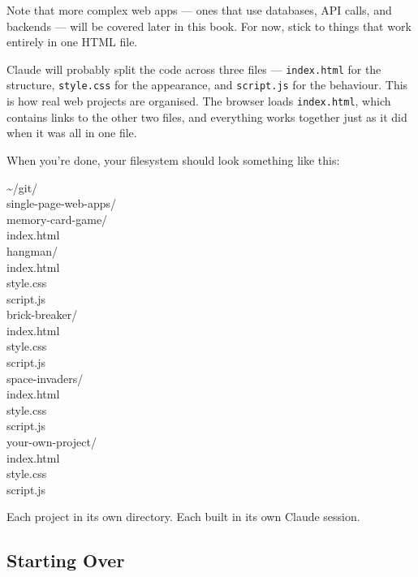 \documentclass[11pt,a4paper]{article}
\begin{document}
Note that more complex web apps --- ones that use databases, API calls, and backends --- will be covered later in this book. For now, stick to things that work entirely in one HTML file.

Claude will probably split the code across three files --- \texttt{index.html} for the structure, \texttt{style.css} for the appearance, and \texttt{script.js} for the behaviour. This is how real web projects are organised. The browser loads \texttt{index.html}, which contains links to the other two files, and everything works together just as it did when it was all in one file.

\bigskip

When you're done, your filesystem should look something like this:

\begin{tcolorbox}[termbox]
\textasciitilde/git/\\
\quad single-page-web-apps/\\
\quad\quad memory-card-game/\\
\quad\quad\quad index.html\\
\quad\quad hangman/\\
\quad\quad\quad index.html\\
\quad\quad\quad style.css\\
\quad\quad\quad script.js\\
\quad\quad brick-breaker/\\
\quad\quad\quad index.html\\
\quad\quad\quad style.css\\
\quad\quad\quad script.js\\
\quad\quad space-invaders/\\
\quad\quad\quad index.html\\
\quad\quad\quad style.css\\
\quad\quad\quad script.js\\
\quad\quad your-own-project/\\
\quad\quad\quad index.html\\
\quad\quad\quad style.css\\
\quad\quad\quad script.js
\end{tcolorbox}

Each project in its own directory. Each built in its own Claude session.

\subsection{Starting Over}
\end{document}

